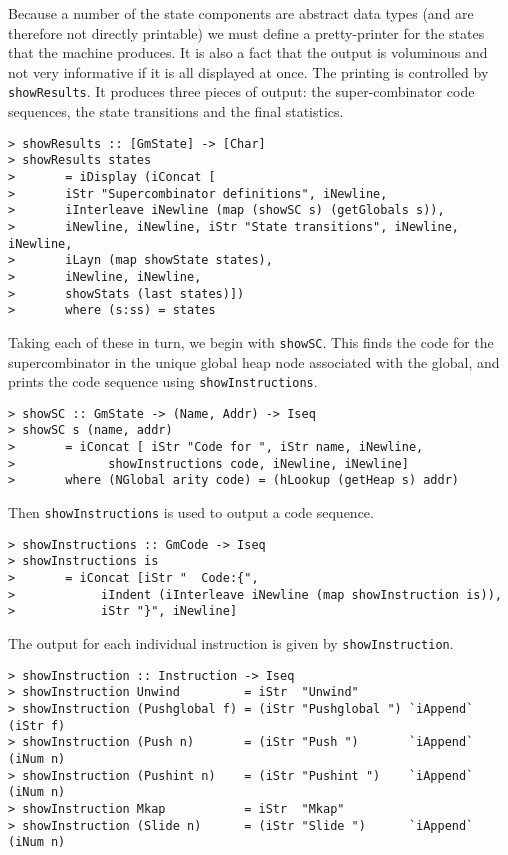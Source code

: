 Because a number of the state components are abstract data types (and
are therefore not directly printable) we must define a pretty-printer
for the states that the machine produces. It is also a fact that the
output is voluminous and not very informative if it is all displayed
at once.
The printing is controlled by \mbox{\tt showResults}. It produces three pieces
of output: the super-combinator code sequences, the state
transitions and the final statistics.
\begin{verbatim}
> showResults :: [GmState] -> [Char]
> showResults states
>       = iDisplay (iConcat [
>       iStr "Supercombinator definitions", iNewline,
>       iInterleave iNewline (map (showSC s) (getGlobals s)),
>       iNewline, iNewline, iStr "State transitions", iNewline, iNewline,
>       iLayn (map showState states),
>       iNewline, iNewline,
>       showStats (last states)])
>       where (s:ss) = states
\end{verbatim}
%
%
\par
Taking each of these in turn, we begin with \mbox{\tt showSC}. This finds the
code for the supercombinator in the unique global heap node
associated with the global, and prints the code sequence using
\mbox{\tt showInstructions}.
\begin{verbatim}
> showSC :: GmState -> (Name, Addr) -> Iseq
> showSC s (name, addr)
>       = iConcat [ iStr "Code for ", iStr name, iNewline,
>             showInstructions code, iNewline, iNewline]
>       where (NGlobal arity code) = (hLookup (getHeap s) addr)
\end{verbatim}
%
%
Then \mbox{\tt showInstructions} is used to output a code sequence.
\begin{verbatim}
> showInstructions :: GmCode -> Iseq
> showInstructions is
>       = iConcat [iStr "  Code:{",
>            iIndent (iInterleave iNewline (map showInstruction is)),
>            iStr "}", iNewline]
\end{verbatim}
%
%
The output for each individual instruction is given by
\mbox{\tt showInstruction}.
\begin{verbatim}
> showInstruction :: Instruction -> Iseq
> showInstruction Unwind         = iStr  "Unwind"
> showInstruction (Pushglobal f) = (iStr "Pushglobal ") `iAppend` (iStr f)
> showInstruction (Push n)       = (iStr "Push ")       `iAppend` (iNum n)
> showInstruction (Pushint n)    = (iStr "Pushint ")    `iAppend` (iNum n)
> showInstruction Mkap           = iStr  "Mkap"
> showInstruction (Slide n)      = (iStr "Slide ")      `iAppend` (iNum n)
\end{verbatim}
